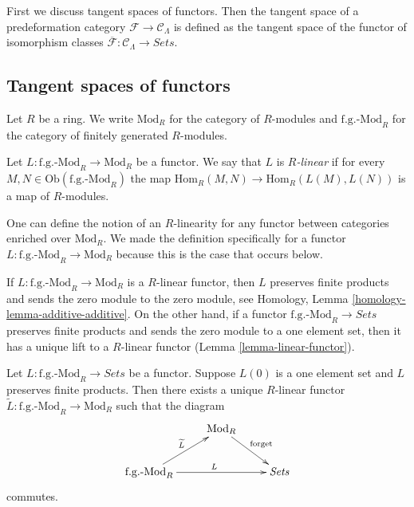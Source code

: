 \noindent
First we discuss tangent spaces of functors. Then the tangent space of a 
predeformation category $\mathcal{F} \to \mathcal{C}_\Lambda$ is 
defined as the tangent space of the functor of isomorphism classes 
$\overline{\mathcal{F}}: \mathcal{C}_\Lambda \to \textit{Sets}$.



\subsection{Tangent spaces of functors}
\label{subsection-tangent-spaces-functors}

\noindent
Let $R$ be a ring. We write $\text{Mod}_{R}$ for the category of 
$R$-modules and $\text{f.g.-Mod}_{R}$ for the category of finitely 
generated $R$-modules.

\begin{definition}
\label{definition-linear}
Let $L: \text{f.g.-Mod}_{R} \to \text{Mod}_{R}$ be a 
functor.  We say that $L$ is {\it $R$-linear} if for every $M,N \in 
\text{Ob}(\text{f.g.-Mod}_{R})$ the map $\text{Hom}_{R}(M,N) 
\to \text{Hom}_{R}(L(M),L(N))$ is a map of $R$-modules.
\end{definition}

\begin{remark}
\label{remark-linear-enriched-over-modules}
One can define the notion of an $R$-linearity for any functor between 
categories enriched over $\text{Mod}_{R}$. We made the definition 
specifically for a functor $L: \text{f.g.-Mod}_{R} \to 
\text{Mod}_{R}$ because this is the case that occurs below.
\end{remark}

\begin{remark}
\label{remark-linear-functor}
If $L: \text{f.g.-Mod}_{R} \to \text{Mod}_{R}$ is a 
$R$-linear functor, then $L$ preserves finite products and sends the zero 
module to the zero module, see
Homology, Lemma \ref{homology-lemma-additive-additive}.
On the other hand, if a functor
$\text{f.g.-Mod}_{R} \to \textit{Sets}$ 
preserves finite products and sends the zero module to a one element set, then 
it has a unique lift to a $R$-linear functor (Lemma \ref{lemma-linear-functor}).
\end{remark}

\begin{lemma}
\label{lemma-linear-functor}
Let $L: \text{f.g.-Mod}_{R} \to \textit{Sets}$ be a 
functor.  Suppose $L(0)$ is a one element set and $L$ preserves finite 
products.  Then there exists a unique $R$-linear functor $\widetilde{L}: 
\text{f.g.-Mod}_{R} \to \text{Mod}_{R}$ such that the 
diagram
\[ 
\xymatrix{
& \text{Mod}_{R} \ar[dr]^{\text{forget}} &   \\
\text{f.g.-Mod}_{R}  \ar[ur]^{\widetilde{L}} \ar[rr]^{L} &  & 
\textit{Sets}
}
\]
commutes.
\end{lemma}

